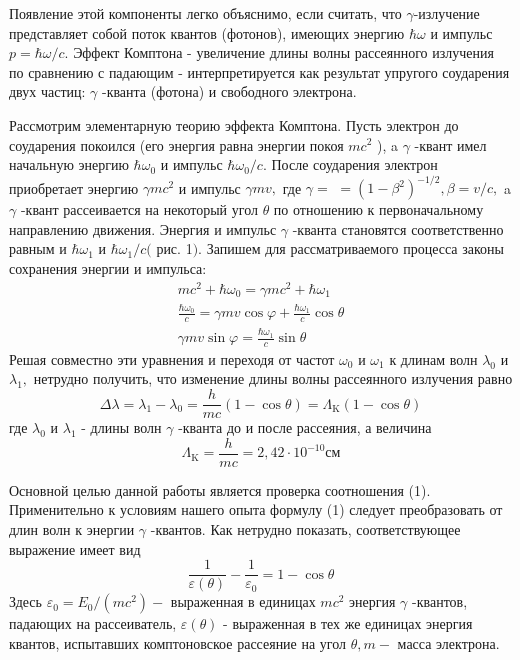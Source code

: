 \documentclass[a4paper, 12pt]{article}%
\begin{document}
	Появление этой компоненты легко объяснимо, если считать, что $\gamma$-излучение представляет собой поток квантов (фотонов), имеющих энергию $\hbar \omega$ и импульс $p=\hbar \omega / c .$ Эффект Комптона - увеличение длины волны рассеянного излучения по сравнению с падающим - интерпретируется как результат упругого соударения двух частиц: $\gamma$ -кванта (фотона) и свободного электрона.
	
	Рассмотрим элементарную теорию эффекта Комптона. Пусть электрон до соударения покоился (его энергия равна энергии покоя $m c^{2}$ ), a $\gamma$ -квант имел начальную энергию $\hbar \omega_{0}$ и импульс $\hbar \omega_{0} / c .$ После соударения электрон приобретает энергию $\gamma m c^{2}$ и импульс $\gamma m v,$ где $\gamma=$ $=\left(1-\beta^{2}\right)^{-1 / 2}, \beta=v / c,$ a $\gamma$ -квант рассеивается на некоторый угол $\theta$ по отношению к первоначальному направлению движения. Энергия и импульс $\gamma$ -кванта становятся соответственно равным и $\hbar \omega_{1}$ и $\hbar \omega_{1} / c($ рис. 1$)$. Запишем для рассматриваемого процесса законы сохранения энергии и импульса:
	$$
	\begin{array}{c}
		m c^{2}+\hbar \omega_{0}=\gamma m c^{2}+\hbar \omega_{1} \\
		\frac{\hbar \omega_{0}}{c}=\gamma m v \cos \varphi+\frac{\hbar \omega_{1}}{c} \cos \theta \\
		\gamma m v \sin \varphi=\frac{\hbar \omega_{1}}{c} \sin \theta
	\end{array}
	$$
	Решая совместно эти уравнения и переходя от частот $\omega_{0}$ и $\omega_{1}$ к длинам волн $\lambda_{0}$ и $\lambda_{1},$ нетрудно получить, что изменение длины волны рассеянного излучения равно
	\begin{equation}
		\Delta \lambda=\lambda_{1}-\lambda_{0}=\frac{h}{m c}(1-\cos \theta)=\Lambda_{\mathrm{K}}(1-\cos \theta)
	\end{equation}
	где $\lambda_{0}$ и $\lambda_{1}$ - длины волн $\gamma$ -кванта до и после рассеяния, а величина
	$$
	\Lambda_{\mathrm{K}}=\frac{h}{m c}=2,42 \cdot 10^{-10} \text{см}
	$$
	
	Основной целью данной работы является проверка соотношения
	(1). Применительно к условиям нашего опыта формулу
	(1) следует преобразовать от длин волн к энергии $\gamma$ -квантов. Как нетрудно показать, соответствующее выражение имеет вид
	\begin{equation}
		\frac{1}{\varepsilon(\theta)}-\frac{1}{\varepsilon_{0}}=1-\cos \theta
	\end{equation}
	Здесь $\varepsilon_{0}=E_{0} /\left(m c^{2}\right)-$ выраженная в единицах $m c^{2}$ энергия $\gamma$ -квантов, падающих на рассеиватель, $\varepsilon(\theta)$ - выраженная в тех же единицах энергия квантов, испытавших комптоновское рассеяние на угол $\theta, m-$ масса электрона.\\
	
\end{document}
